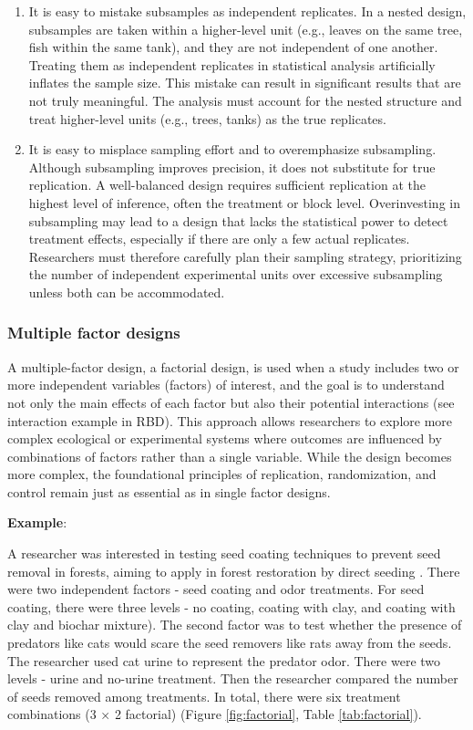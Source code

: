 \documentclass[
]{book}
\providecommand{\tightlist}{%
  \setlength{\itemsep}{0pt}\setlength{\parskip}{0pt}}
\begin{document}
\begin{enumerate}
\def\labelenumi{\arabic{enumi}.}
\tightlist
\item
  It is easy to mistake subsamples as independent replicates. In a nested design, subsamples are taken within a higher-level unit (e.g., leaves on the same tree, fish within the same tank), and they are not independent of one another. Treating them as independent replicates in statistical analysis artificially inflates the sample size. This mistake can result in significant results that are not truly meaningful. The analysis must account for the nested structure and treat higher-level units (e.g., trees, tanks) as the true replicates.
\item
  It is easy to misplace sampling effort and to overemphasize subsampling. Although subsampling improves precision, it does not substitute for true replication. A well-balanced design requires sufficient replication at the highest level of inference, often the treatment or block level. Overinvesting in subsampling may lead to a design that lacks the statistical power to detect treatment effects, especially if there are only a few actual replicates. Researchers must therefore carefully plan their sampling strategy, prioritizing the number of independent experimental units over excessive subsampling unless both can be accommodated.
\end{enumerate}

\subsubsection{Multiple factor designs}\label{multiple-factor-designs}

A multiple-factor design, a factorial design, is used when a study includes two or more independent variables (factors) of interest, and the goal is to understand not only the main effects of each factor but also their potential interactions (see interaction example in RBD). This approach allows researchers to explore more complex ecological or experimental systems where outcomes are influenced by combinations of factors rather than a single variable. While the design becomes more complex, the foundational principles of replication, randomization, and control remain just as essential as in single factor designs.

\textbf{Example}:

A researcher was interested in testing seed coating techniques to prevent seed removal in forests, aiming to apply in forest restoration by direct seeding \citep{rodpothong2018}. There were two independent factors - seed coating and odor treatments. For seed coating, there were three levels - no coating, coating with clay, and coating with clay and biochar mixture). The second factor was to test whether the presence of predators like cats would scare the seed removers like rats away from the seeds. The researcher used cat urine to represent the predator odor. There were two levels - urine and no-urine treatment. Then the researcher compared the number of seeds removed among treatments. In total, there were six treatment combinations (3 × 2 factorial) (Figure \ref{fig:factorial}, Table \ref{tab:factorial}).
\end{document}
